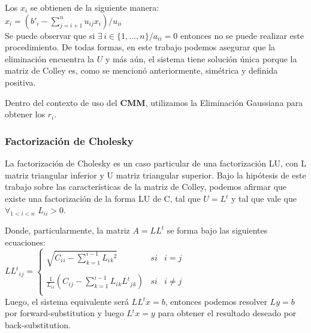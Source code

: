 Los $x{_i}$ se obtienen de la siguiente manera: \\

$x{_i} = (b'{_i} - \sum\limits_{j = i + 1}^n u_{ij}x_{i}) / u_{ii}$ \\

Se puede observar que si $\exists \, i \in \{1, ..., n\} / a_{ii} = 0$ entonces no se puede realizar este procedimiento. De todas formas, en este trabajo podemos asegurar que la eliminaci\'on encuentra la $U$ y m\'as a\'un, el sistema tiene soluci\'on \'unica porque la matriz de Colley es, como se mencion\'o anteriormente, sim\'etrica y definida positiva.

Dentro del contexto de uso del \textbf{CMM}, utilizamos la Eliminaci\'on Gaussiana para obtener los $r_i$.

\subsubsection{Factorizaci\'on de Cholesky} \label{intro_cholesky}

La factorizaci\'on de Cholesky es un caso particular de una factorizaci\'on LU, con L matriz triangular inferior y U matriz triangular superior. Bajo la hip\'otesis de este trabajo sobre las caracter\'isticas de la matriz de Colley, podemos afirmar que existe una factorizaci\'on de la forma LU de C, tal que $U = L{^t}$ y tal que vale que $\displaystyle\mathop{\forall}_{1 < i < n}$ $L_{ii} > 0$.

Donde, particularmente, la matriz $A = LL^{t}$ se forma bajo las siguientes ecuaciones: \\

$LL{^t}{_i}{_j} =
\left\{
	\begin{array}{lcc}
		\sqrt{C{_i}{_i} - \sum\limits_{k=1}^{i-1} L{_i}{_k}^2} & si & i = j \\
		\\ \frac{1}{L{_i}{_i}}(C{_i}{_j} - \sum\limits_{k=1}^{i-1} L{_i}{_k}L{^t}{_j}{_k}) & si & i \neq j \\
	\end{array}
\right.$ \\

Luego, el sistema equivalente ser\'a $LL{^t}x = b$, entonces podemos resolver $Ly = b$ por forward-substitution y luego $L{^t}x = y$ para obtener el resultado deseado por back-substitution.
